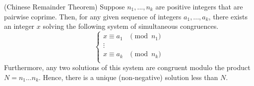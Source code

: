 \documentclass[anon,12pt]{colt2016}
\begin{document}

\begin{lemma}(Chinese Remainder Theorem)
\label{chinese}
Suppose $n_1, ..., n_k$ are positive integers that are pairwise coprime. Then, for any given sequence of integers $a_1, ..., a_k$, there exists an integer $x$ solving the following system of simultaneous congruences.
$$
\left\{ \begin{array}{cl}
     x \equiv a_1 &\pmod{n_1} \\
      \vdots &\\
      x \equiv a_k &\pmod{n_k} \\
\end{array} \right.		
$$
Furthermore, any two solutions of this system are congruent modulo the product $N = n_1 \ldots n_k$. Hence, there is a unique (non-negative) solution less than $N$.

\end{lemma}
\end{document}
